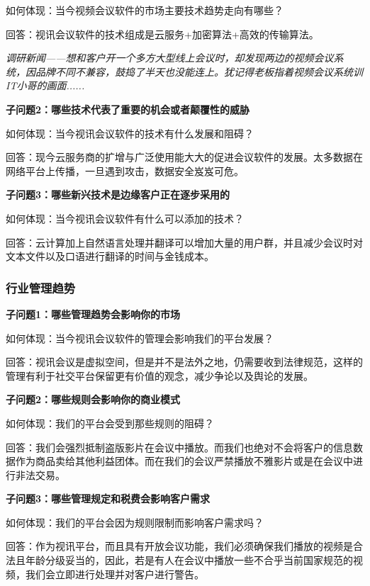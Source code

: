 \documentclass[a4paper,12pt]{article}
\begin{document}
    如何体现：当今视频会议软件的市场主要技术趋势⾛向有哪些？

    回答：视讯会议软件的技术组成是云服务+加密算法+⾼效的传输算法。

    \textit{调研新闻——想和客户开⼀个多⽅⼤型线上会议时，却发现两边的视频会议系统，因品牌不同不兼容，⿎捣了半天也没能连上。犹记得⽼板指着视频会议系统训IT⼩哥的画⾯......}

    \textit{}

    \textbf{子问题2：哪些技术代表了重要的机会或者颠覆性的威胁}

    如何体现：当今视讯会议软件的技术有什么发展和阻碍？

    回答：现今云服务商的扩增与⼴泛使⽤能⼤⼤的促进会议软件的发展。太多数据在⽹络平台上传播，⼀旦遇到攻击，数据安全岌岌可危。

    \textbf{子问题3：哪些新兴技术是边缘客户正在逐步采用的}

    如何体现：当今视讯会议软件有什么可以添加的技术？

    回答：云计算加上⾃然语⾔处理并翻译可以增加⼤量的⽤户群，并且减少会议时对⽂本⽂件以及⼝语进⾏翻译的时间与⾦钱成本。

    \subsubsection{行业管理趋势}
    \textbf{子问题1：哪些管理趋势会影响你的市场}

    如何体现：当今视讯会议软件的管理会影响我们的平台发展？

    回答：视讯会议是虚拟空间，但是并不是法外之地，仍需要收到法律规范，这样的管理有利于社交平台保留更有价值的观念，减少争论以及舆论的发展。
    
    \textbf{子问题2：哪些规则会影响你的商业模式}

    如何体现：我们的平台会受到那些规则的阻碍？

    回答：我们会强烈抵制盗版影⽚在会议中播放。⽽我们也绝对不会将客户的信息数据作为商品卖给其他利益团体。⽽在我们的会议严禁播放不雅影⽚或是在会议中进⾏⾮法交易。

    \textbf{子问题3：哪些管理规定和税费会影响客户需求}

    如何体现：我们的平台会因为规则限制⽽影响客户需求吗？

    回答：作为视讯平台，⽽且具有开放会议功能，我们必须确保我们播放的视频是合法且年龄分级妥当的，因此，若是有⼈在会议中播放⼀些不合乎当前国家规范的视频，我们会⽴即进⾏处理并对客户进⾏警告。
\end{document}
